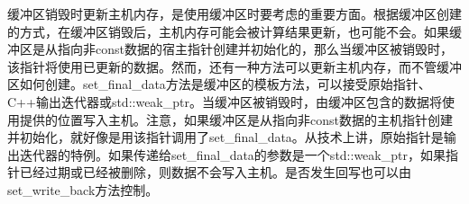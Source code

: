 缓冲区销毁时更新主机内存，是使用缓冲区时要考虑的重要方面。根据缓冲区创建的方式，在缓冲区销毁后，主机内存可能会被计算结果更新，也可能不会。如果缓冲区是从指向非const数据的宿主指针创建并初始化的，那么当缓冲区被销毁时，该指针将使用已更新的数据。然而，还有一种方法可以更新主机内存，而不管缓冲区如何创建。set\_final\_data方法是缓冲区的模板方法，可以接受原始指针、C++输出迭代器或std::weak\_ptr。当缓冲区被销毁时，由缓冲区包含的数据将使用提供的位置写入主机。注意，如果缓冲区是从指向非const数据的主机指针创建并初始化，就好像是用该指针调用了set\_final\_data。从技术上讲，原始指针是输出迭代器的特例。如果传递给set\_final\_data的参数是一个std::weak\_ptr，如果指针已经过期或已经被删除，则数据不会写入主机。是否发生回写也可以由set\_write\_back方法控制。\par





























